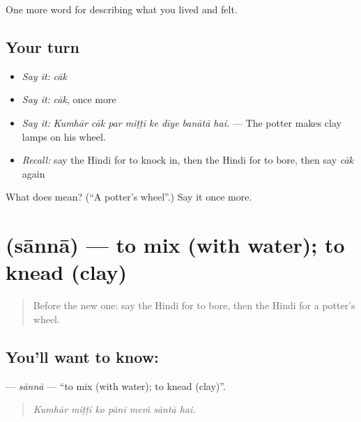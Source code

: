 \begin{grammarlens}[title={What you've built}]
One more word for describing what you lived and felt.
\end{grammarlens}

\subsection*{Your turn}
\begin{itemize}
\raggedright
  \item \emph{Say it:} \emph{cāk}
  \item \emph{Say it:} \emph{cāk}, once more
  \item \emph{Say it:} \emph{Kumhār cāk par miṭṭī ke dīye banātā hai.} — The potter makes clay lamps on his wheel.
  \item \emph{Recall:} say the Hindi for to knock in, then the Hindi for to bore, then say \emph{cāk} again
\end{itemize}

\begin{tcolorbox}[breakable,colback=teal!4,colframe=teal!35!black,title={Before you move on}]
What does  mean? (\textquotedblleft{}A potter's wheel\textquotedblright{}.) Say it once more.
\end{tcolorbox}
\section[\texorpdfstring{\hi{सानना} (sānnā)}{सानना (sānnā)}]{ (sānnā) — to mix (with water); to knead (clay)}

\label{lesson:HI-C511-sanna}



\begin{quote}
Before the new one: say the Hindi for to bore, then the Hindi for a potter's wheel.
\end{quote}

\subsection*{You'll want to know: }
\textbf{} — \emph{sānnā} — \textquotedblleft{}to mix (with water); to knead (clay)\textquotedblright{}.

\begin{quote}
      
\end{quote}

\begin{quote}
\emph{Kumhār miṭṭī ko pānī meṁ sāntā hai.}
\end{quote}

